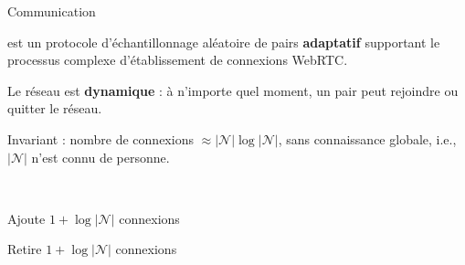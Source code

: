 \begin{frame}{Communication}{\SPRAY}

  \SPRAY est un protocole d'échantillonnage aléatoire de pairs
  \textbf{adaptatif} supportant le processus complexe d'établissement de
  connexions WebRTC.

  \vspace{0.5cm}


  Le réseau est \textbf{dynamique} : à n'importe quel moment, un pair peut
  rejoindre ou quitter le réseau. \\
  
  \vspace{0.5cm}

  Invariant : nombre de connexions $\approx |\mathcal{N}| \log |\mathcal{N}|$,
  sans connaissance globale, i.e., $|\mathcal{N}|$ n'est connu de personne.

  \vspace{1cm}

  \begin{minipage}{0.32\textwidth}
    \begin{center}
      
    \end{center}
  \end{minipage}
  \begin{minipage}{0.32\textwidth}
    \begin{center}
      \\
    \end{center}
  \end{minipage}
  \begin{minipage}{0.32\textwidth}
    \begin{center}
      
    \end{center}
  \end{minipage}

  \vspace{0.15cm}

  \begin{minipage}{0.32\textwidth}
    \begin{center}
      \small Ajoute $1+\log |\mathcal{N}|$ connexions
    \end{center}
  \end{minipage}
  \begin{minipage}{0.32\textwidth}
    \begin{center}
    \end{center}
  \end{minipage}
  \begin{minipage}{0.32\textwidth}
    \begin{center}
      \small Retire $1+\log |\mathcal{N}|$ connexions
    \end{center}
  \end{minipage}




\end{frame}
